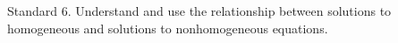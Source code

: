 Standard 6.	Understand and use the relationship between solutions to homogeneous and solutions to nonhomogeneous equations. 

\ifprintanswers
\else %
 \newpage
\fi

\begin{solution}
   
\end{solution}